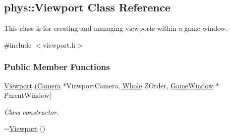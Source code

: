 \hypertarget{classphys_1_1Viewport}{
\subsection{phys::Viewport Class Reference}
\label{d5/d62/classphys_1_1Viewport}
}


This class is for creating and managing viewports within a game window.  




{\ttfamily \#include $<$viewport.h$>$}

\subsubsection*{Public Member Functions}
\begin{DoxyCompactItemize}
\item 
\hyperlink{classphys_1_1Viewport_a83634ee2144fadd80fec3028885b92f2}{Viewport} (\hyperlink{classphys_1_1Camera}{Camera} $\ast$ViewportCamera, \hyperlink{namespacephys_a460f6bc24c8dd347b05e0366ae34f34a}{Whole} ZOrder, \hyperlink{classphys_1_1GameWindow}{GameWindow} $\ast$ParentWindow)
\begin{DoxyCompactList}\small\item\em Class constructor. \item\end{DoxyCompactList}\item 
\hypertarget{classphys_1_1Viewport_a2ac669dde60b69641d309e81c3108db4}{
\hyperlink{classphys_1_1Viewport_a2ac669dde60b69641d309e81c3108db4}{$\sim$Viewport} ()}
\label{d5/d62/classphys_1_1Viewport_a2ac669dde60b69641d309e81c3108db4}


\end{DoxyCompactItemize}
